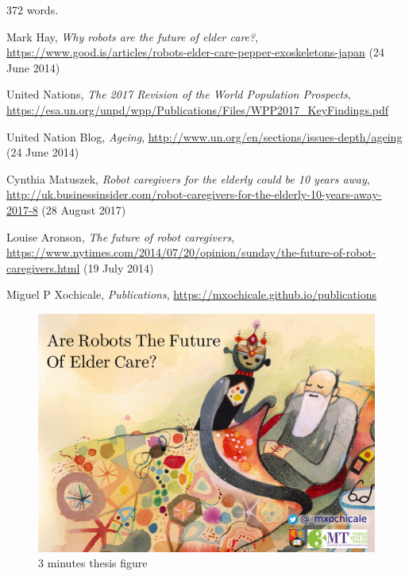\documentclass[11pt]{article}
\begin{document}
372 words. 



\begin{thebibliography}{10}

Mark Hay,
{\it Why robots are the future of elder care?},
{\url{https://www.good.is/articles/robots-elder-care-pepper-exoskeletons-japan}} (24 June 2014)


United Nations,
{\it The 2017 Revision of the World Population Prospects},
{\url{https://esa.un.org/unpd/wpp/Publications/Files/WPP2017_KeyFindings.pdf}}


United Nation Blog,
{\it Ageing},
{\url{http://www.un.org/en/sections/issues-depth/ageing}} (24 June 2014)


Cynthia Matuszek,
{\it Robot caregivers for the elderly could be 10 years away},
{\url{http://uk.businessinsider.com/robot-caregivers-for-the-elderly-10-years-away-2017-8}} (28 August 2017)


Louise Aronson,
{\it The future of robot caregivers},
{\url{https://www.nytimes.com/2014/07/20/opinion/sunday/the-future-of-robot-caregivers.html}} (19 July 2014)



Miguel P Xochicale,
{\it Publications},
{\url{https://mxochicale.github.io/publications}}


\end{thebibliography}


\newpage

\begin{figure}
\centering
\includegraphics{figure02}
\caption{3 minutes thesis figure}
\end{figure}
\end{document}
